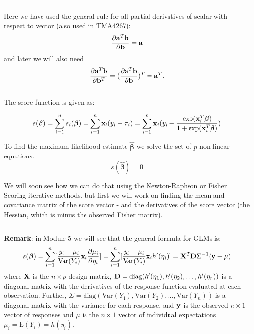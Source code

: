 \documentclass[
]{article}
\begin{document}
\begin{center}\rule{0.5\linewidth}{0.5pt}\end{center}

Here we have used the general rule for all partial derivatives of scalar
with respect to vector (also used in TMA4267):
\[\frac{\partial{\bf a}^T{\bf b}}{\partial {\bf b}}={\bf a}\] and later
we will also need
\[\frac{\partial{\bf a}^T{\bf b}}{\partial {\bf b}^T}=(\frac{\partial{\bf a}^T{\bf b}}{\partial {\bf b}})^T={\bf a}^T.\]

\begin{center}\rule{0.5\linewidth}{0.5pt}\end{center}

The score function is given as:

\[s(\boldsymbol{\beta})=\sum_{i=1}^n s_i(\boldsymbol{\beta})=\sum_{i=1}^n {\bf x}_i (y_i-\pi_i)=\sum_{i=1}^n {\bf x}_i (y_i-\frac{\exp({\bf x}_i^T\boldsymbol{\beta})}{1+\exp({\bf x}_i^T\boldsymbol{\beta})})\]

To find the maximum likelihood estimate \(\hat{\boldsymbol{\beta}}\) we
solve the set of \(p\) non-linear equations:
\[s(\hat{\boldsymbol{\beta}})=0\]

We will soon see how we can do that using the Newton-Raphson or Fisher
Scoring iterative methods, but first we will work on finding the mean
and covariance matrix of the score vector - and the derivatives of the
score vector (the Hessian, which is minus the observed Fisher matrix).

\begin{center}\rule{0.5\linewidth}{0.5pt}\end{center}

\textbf{Remark}: in Module 5 we will see that the general formula for
GLMs is: \[s(\boldsymbol{\beta})=\sum_{i=1}^n
[\frac{y_i-\mu_i}{\text{Var}(Y_i)}{\bf x}_i \frac{\partial \mu_i}{\partial \eta_i}]=\sum_{i=1}^n
[\frac{y_i-\mu_i}{\text{Var}(Y_i)}{\bf x}_i h'(\eta_i)]={\bf X}^T {\bf D} \Sigma^{-1} ({\bf y} -\mu)\]
where \({\bf X}\) is the \(n\times p\) design matrix,
\({\bf D}=\text{diag}(h'(\eta_1),h'(\eta_2),\ldots,h'(\eta_n))\) is a
diagonal matrix with the derivatives of the response function evaluated
at each observation. Further,
\(\Sigma=\text{diag}(\text{Var}(Y_1),\text{Var}(Y_2),\ldots,\text{Var}(Y_n))\)
is a diagonal matrix with the variance for each response, and
\({\bf y}\) is the observed \(n\times 1\) vector of responses and
\(\mu\) is the \(n\times 1\) vector of individual expectations
\(\mu_i=\text{E}(Y_i)=h(\eta_i)\).
\end{document}
